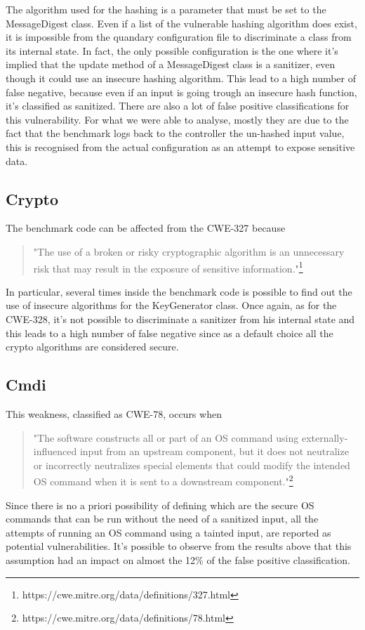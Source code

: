 \documentclass[../Report.tex]{subfiles}
\begin{document}
The algorithm used for the hashing is a parameter that must be set to the MessageDigest class. Even if a list of the vulnerable hashing algorithm does exist, it is impossible from the quandary configuration file to discriminate a class from its internal state. In fact, the only possible configuration is the one where it's implied that the update method of a MessageDigest class is a sanitizer, even though it could use an insecure hashing algorithm. This lead to a high number of false negative, because even if an input is going trough an insecure hash function, it's classified as sanitized. There are also a lot of false positive classifications for this vulnerability. For what we were able to analyse, mostly they are due to the fact that the benchmark logs back to the controller the un-hashed input value, this is recognised from the actual configuration as an attempt to expose sensitive data.  \\

\subsection{Crypto}

The benchmark code can be affected from the CWE-327 because

\begin{quote}
	"The use of a broken or risky cryptographic algorithm is an unnecessary risk that may result in the exposure of sensitive information."\footnote{https://cwe.mitre.org/data/definitions/327.html}
\end{quote}

In particular, several times inside the benchmark code is possible to find out the use of insecure algorithms for the KeyGenerator class. Once again, as for the CWE-328, it's not possible to discriminate a sanitizer from his internal state and this leads to a high number of false negative since as a default choice all the crypto algorithms are considered secure. 
\subsection{Cmdi}

This weakness, classified as CWE-78, occurs when

\begin{quote}
 "The software constructs all or part of an OS command using externally-influenced input from an upstream component, but it does not neutralize or incorrectly neutralizes special elements that could modify the intended OS command when it is sent to a downstream component."\footnote{https://cwe.mitre.org/data/definitions/78.html}	
\end{quote}

Since there is no a priori possibility of defining which are the secure OS commands that can be run without the need of a sanitized input, all the attempts of running an OS command using a tainted input, are reported as potential vulnerabilities. It's possible to observe from the results above that this assumption had an impact on almost the 12\% of the false positive classification.\\

\clearpage
\end{document}
